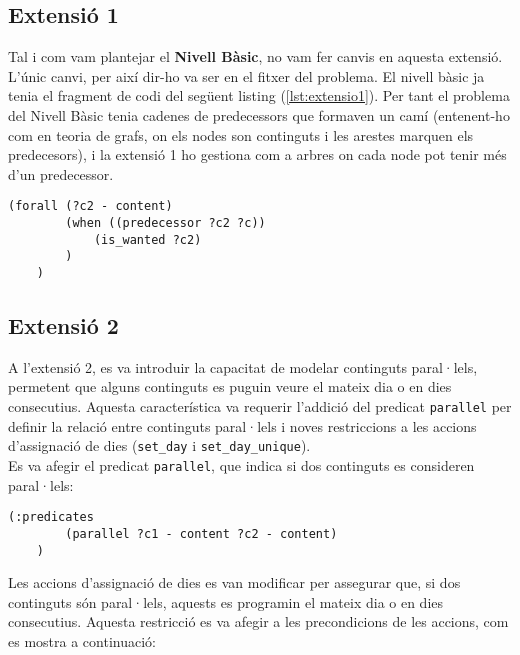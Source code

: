 \documentclass[a4paper]{article}
\begin{document}
	\subsection{Extensió 1}
	
	Tal i com vam plantejar el \textbf{Nivell Bàsic}, no vam fer canvis en aquesta extensió. L'únic canvi, per així dir-ho va ser en el fitxer del problema. El nivell bàsic ja tenia el fragment de codi del següent listing (\ref{lst:extensio1}). Per tant el problema del Nivell Bàsic tenia cadenes de predecessors que formaven un camí (entenent-ho com en teoria de grafs, on els nodes son continguts i les arestes marquen els predecesors), i la extensió 1 ho gestiona com a arbres on cada node pot tenir més d'un predecessor. \\
	
	\begin{lstlisting}[language=PDDL, caption={Fragment per assignar més d'un predecessor com a pendent de veure}, label={lst:extensio1}]
	(forall (?c2 - content)
		(when ((predecessor ?c2 ?c))
			(is_wanted ?c2)
		)
	)
	\end{lstlisting}
	
	\subsection{Extensió 2}
	
	A l'extensió 2, es va introduir la capacitat de modelar continguts paral·lels, permetent que alguns continguts es puguin veure el mateix dia o en dies consecutius. Aquesta característica va requerir l'addició del predicat \texttt{parallel} per definir la relació entre continguts paral·lels i noves restriccions a les accions d'assignació de dies (\texttt{set\_day} i \texttt{set\_day\_unique}).\\
	
	Es va afegir el predicat \texttt{parallel}, que indica si dos continguts es consideren paral·lels:
	\begin{lstlisting}[language=PDDL, caption={Definició del predicat \texttt{parallel}}, label={lst:predicatParallel}]
	(:predicates
		(parallel ?c1 - content ?c2 - content)
	)
	\end{lstlisting}
	
	Les accions d'assignació de dies es van modificar per assegurar que, si dos continguts són paral·lels, aquests es programin el mateix dia o en dies consecutius. Aquesta restricció es va afegir a les precondicions de les accions, com es mostra a continuació:
	
\end{document}
